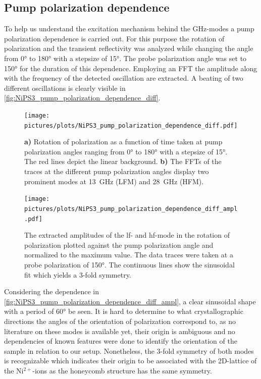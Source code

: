 \subsection{Pump polarization dependence}
To help us understand the excitation mechanism behind the GHz-modes a pump polarization dependence is carried out.
For this purpose the rotation of polarization and the transient reflectivity was analyzed while changing the angle from 0° to 180° with a stepsize of 15°.
The probe polarization angle was set to 150° for the duration of this dependence.
Employing an FFT the amplitude along with the frequency of the detected oscillation are extracted.
A beating of two different oscillations is clearly visible in \autoref{fig:NiPS3_pump_polarization_dependence_diff}.
\begin{figure}[hbt!]
    \centering
    \texttt{[image: pictures/plots/NiPS3\_pump\_polarization\_dependence\_diff.pdf]} \vspace{-0.3cm}
    \caption{\textbf{a)} Rotation of polarization as a function of time taken at pump polarization angles ranging from 0° to 180° with a stepsize of 15°. The red lines depict the linear background. \textbf{b)} The FFTs of the traces at the different pump polarization angles display two prominent modes at \qty{13}{GHz} (LFM) and \qty{28}{GHz} (HFM).}
    \label{fig:NiPS3_pump_polarization_dependence_diff}
\end{figure}
\FloatBarrier
\begin{figure}[hbt!]
    \centering  
    \texttt{[image: pictures/plots/NiPS3\_pump\_polarization\_dependence\_diff\_ampl.pdf]} \vspace{-0.3cm}
    \caption{The extracted amplitudes of the lf- and hf-mode in the rotation of polarization plotted against the pump polarization angle and normalized to the maximum value. The data traces were taken at a probe polarization of 150°. The continuous lines show the sinusoidal fit which yields a 3-fold symmetry.}
    \label{fig:NiPS3_pump_polarization_dependence_diff_ampl}
\end{figure}
\FloatBarrier
Considering the dependence in \autoref{fig:NiPS3_pump_polarization_dependence_diff_ampl}, a clear sinusoidal shape with a period of 60° be seen.
It is hard to determine to what crystallographic directions the angles of the orientation of polarization correspond to, as no literature on these modes is available yet, their origin is ambiguous and no dependencies of known features were done to identify the orientation of the sample in relation to our setup.
Nonetheless, the 3-fold symmetry of both modes is recognizable which indicates their origin to be associated with the 2D-lattice of the Ni$^{2+}$-ions as the honeycomb structure has the same symmetry.

